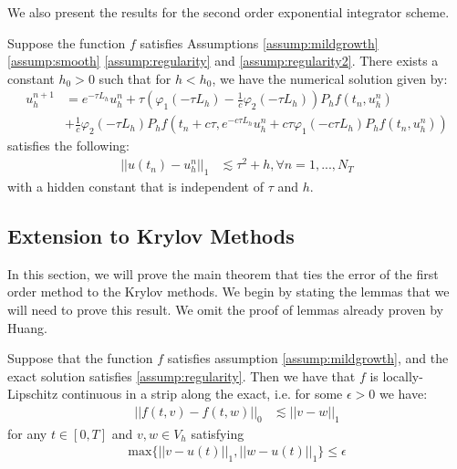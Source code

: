 We also present the results for the second order exponential integrator scheme.
\begin{theorem}\label{theorem:standard2}
    Suppose the function $f$ satisfies Assumptions \ref{assump:mildgrowth} \ref{assump:smooth} \ref{assump:regularity} and \ref{assump:regularity2}.
    There exists a constant $h_0 > 0$ such that for $h<h_0$, we have the numerical solution given by:
    \begin{align*}
        u_h^{n+1} &= e^{-\tau L_h}u_h^n + \tau (\varphi_1(-\tau L_h) - \frac{1}{c}\varphi_2(-\tau L_h))P_hf(t_n,u_h^n)\\
        &+\frac{1}{c}\varphi_2(-\tau L_h)P_hf(t_n + c\tau,e^{-c\tau L_h}u_h^n + c\tau\varphi_1(-c\tau L_h)P_hf(t_n,u_h^n))
    \end{align*}
    satisfies the following:
    \begin{align*}
        ||u(t_n) - u_h^n||_1 &\lesssim \tau^2 + h, \forall n =1,...,N_T
    \end{align*}
    with a hidden constant that is independent of $\tau$ and $h$.
\end{theorem}

\subsection{Extension to Krylov Methods}

In this section, we will prove the main theorem that ties the error of the first order method to the Krylov methods.
We begin by stating the lemmas that we will need to prove this result.
We omit the proof of lemmas already proven by Huang\cite{Huang2022}.

\begin{lemma} \label{lemma:Lipschitz}
    Suppose that the function $f$ satisfies assumption \ref{assump:mildgrowth}, and the exact solution satisfies \ref{assump:regularity}.
    Then we have that $f$ is locally-Lipschitz continuous in a strip along the exact, i.e. for some $\epsilon > 0$ we have:
    \begin{align*}
        ||f(t,v) - f(t,w)||_0 &\lesssim ||v-w||_1
    \end{align*}
    for any $t\in [0,T]$ and $v,w \in V_h$ satisfying
    \begin{align*}
        \text{max}\{||v-u(t)||_1,||w-u(t)||_1\}\leq \epsilon
    \end{align*}
\end{lemma}

